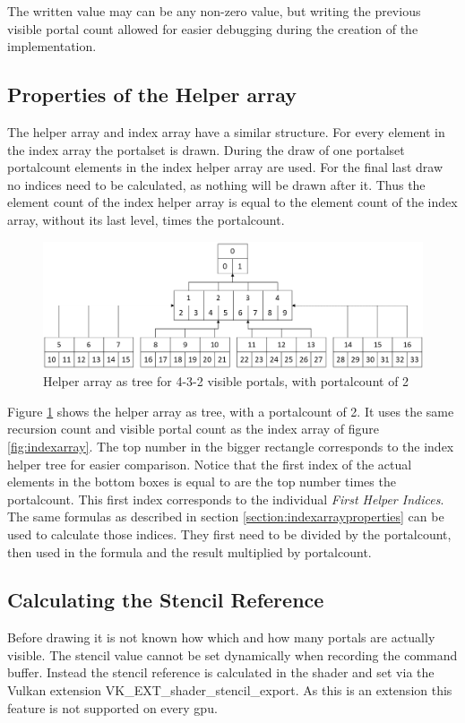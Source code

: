 The written value may can be any non-zero value, but writing the previous visible portal count allowed for easier debugging during the creation of the implementation.

\subsection{Properties of the Helper array}
\label{section:helperarrayproperties}
The helper array and index array have a similar structure. For every element in the index array the \gls{portalset} is drawn. During the draw of one \gls{portalset} \gls{portalcount} elements in the index helper array are used. For the final last draw no indices need to be calculated, as nothing will be drawn after it. Thus the element count of the index helper array is equal to the element count of the index array, without its last level, times the \gls{portalcount}.

\begin{figure}[h]
	\includegraphics[width=\linewidth]{images/helperarray.png}
	\caption{Helper array as tree for 4-3-2 visible portals, with \gls{portalcount} of 2}
	\label{fig:helperarray}
\end{figure}

Figure \ref{fig:helperarray} shows the helper array as tree, with a \gls{portalcount} of 2. It uses the same recursion count and visible portal count as the index array of figure \ref{fig:indexarray}. The top number in the bigger rectangle corresponds to the index helper tree for easier comparison. Notice that the first index of the actual elements in the bottom boxes is equal to are the top number times the \gls{portalcount}. This first index corresponds to the individual \textit{First Helper Indices}. The same formulas as described in section \ref{section:indexarrayproperties} can be used to calculate those indices. They first need to be divided by the \gls{portalcount}, then used in the formula and the result multiplied by \gls{portalcount}.


\subsection{Calculating the Stencil Reference}
Before drawing it is not known how which and how many portals are actually visible. The stencil value cannot be set dynamically when recording the command buffer. Instead the stencil reference is calculated in the shader and set via the Vulkan extension VK\_EXT\_shader\_stencil\_export. As this is an extension this feature is not supported on every \gls{gpu}.

